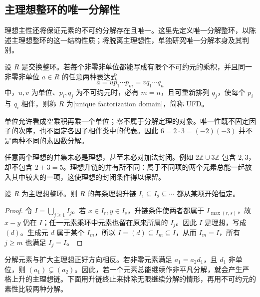 \subsection{主理想整环的唯一分解性}
\label{b1:subsec:1103:02}

理想主性还将保证元素的不可约分解存在且唯一。这里先定义唯一分解整环，以陈述主理想整环的这一结构性质；将脱离主理想性，单独研究唯一分解本身及其判别。

\begin{definition}\label{b1:def:ufd}
	设 \(R\) 是交换整环。若每个非零非单位都能写成有限个不可约元的乘积，并且同一非零非单位 \(a\in R\) 的任意两种表达式
	\[
		a=u p_1\cdots p_m=v q_1\cdots q_n
	\]
	中，\(u,v\) 为单位、\(p_i,q_j\) 为不可约元时，必有 \(m=n\)，且可重新排列 \(q_j\)，使每个 \(p_i\) 与 \(q_i\) 相伴，则称 \(R\) 为[unique factorization domain]，简称 UFD。
\end{definition}

单位允许看成空乘积再乘一个单位；零不属于分解定理的对象。唯一性既不固定因子的次序，也不固定各因子相伴类中的代表。因此 \(6=2\cdot3=(-2)(-3)\) 并不是两种不同的素因数分解。

\ProseParagraphBreak
任意两个理想的并集未必是理想，甚至未必对加法封闭。例如 \(2\mathbb Z\cup3\mathbb Z\) 包含 \(2,3\)，却不包含 \(2+3=5\)。理想升链的并有所不同：属于不同项的两个元素总能一起放入其中较大的一项，这使理想的封闭条件得以保留。

\begin{lemma}\label{b1:lem:pid-ascending-chain}
	设 \(R\) 为主理想整环。则 \(R\) 的每条理想升链 \(I_1\subseteq I_2\subseteq\cdots\) 都从某项开始恒定。
\end{lemma}
\begin{proof}
	令 \(I=\bigcup_{j\geq1}I_j\)。若 \(x\in I_r,y\in I_s\)，升链条件使两者都属于 \(I_{\max(r,s)}\)，故 \(x-y\) 仍在 \(I\)；任一元素乘环中元素也留在原来所属的 \(I_j\)。因此 \(I\) 是理想，写成 \((d)\)。生成元 \(d\) 属于某个 \(I_m\)，所以 \(I=(d)\subseteq I_m\subseteq I\)，从而 \(I_m=I\)，所有 \(j\geq m\) 也满足 \(I_j=I\)。
\end{proof}

分解元素与扩大主理想正好方向相反。若非零元素满足 \(a_1=a_2d_1\)，且 \(d_1\) 非单位，则 \((a_1)\subsetneq(a_2)\)。因此，若一个元素总能继续作非平凡分解，就会产生严格上升的主理想链。下面用升链终止来排除无限继续分解的情形，再用不可约元的素性比较两种分解。

